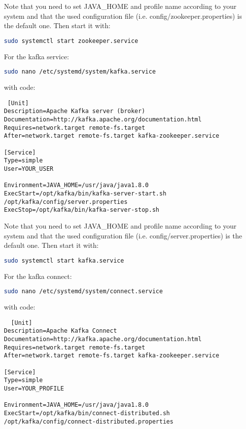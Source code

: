 \begin{appendices}
 Note that you need to set JAVA\_HOME and profile name according to your system and that the used configuration file (i.e. config/zookeeper.properties) is the default one.
 Then start it with:
 \begin{lstlisting}[language=bash]
 sudo systemctl start zookeeper.service
 \end{lstlisting}
 
 For the kafka service:
 
 \begin{lstlisting}[language=bash]
sudo nano /etc/systemd/system/kafka.service
\end{lstlisting}
 with code:
 
 \begin{lstlisting}
 [Unit]
Description=Apache Kafka server (broker)
Documentation=http://kafka.apache.org/documentation.html
Requires=network.target remote-fs.target
After=network.target remote-fs.target kafka-zookeeper.service

[Service]
Type=simple
User=YOUR_USER

Environment=JAVA_HOME=/usr/java/java1.8.0
ExecStart=/opt/kafka/bin/kafka-server-start.sh /opt/kafka/config/server.properties
ExecStop=/opt/kafka/bin/kafka-server-stop.sh

 \end{lstlisting}
 
 Note that you need to set JAVA\_HOME and profile name according to your system and that the used configuration file (i.e. config/server.properties) is the default one.
 Then start it with:
 \begin{lstlisting}[language=bash]
 sudo systemctl start kafka.service
 \end{lstlisting}
 
 
  For the kafka connect:
 
 \begin{lstlisting}[language=bash]
sudo nano /etc/systemd/system/connect.service
\end{lstlisting}
 with code:
 
 \begin{lstlisting}
  [Unit]
Description=Apache Kafka Connect 
Documentation=http://kafka.apache.org/documentation.html
Requires=network.target remote-fs.target
After=network.target remote-fs.target kafka-zookeeper.service

[Service]
Type=simple
User=YOUR_PROFILE

Environment=JAVA_HOME=/usr/java/java1.8.0
ExecStart=/opt/kafka/bin/connect-distributed.sh /opt/kafka/config/connect-distributed.properties


\end{lstlisting}
\end{appendices}
